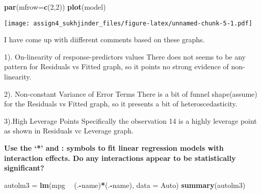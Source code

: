 \documentclass[]{article}
\newenvironment{Shaded}{\begin{snugshade}}{\end{snugshade}}
\newcommand{\KeywordTok}[1]{\textcolor[rgb]{0.13,0.29,0.53}{\textbf{#1}}}
\newcommand{\DataTypeTok}[1]{\textcolor[rgb]{0.13,0.29,0.53}{#1}}
\newcommand{\DecValTok}[1]{\textcolor[rgb]{0.00,0.00,0.81}{#1}}
\newcommand{\StringTok}[1]{\textcolor[rgb]{0.31,0.60,0.02}{#1}}
\newcommand{\OperatorTok}[1]{\textcolor[rgb]{0.81,0.36,0.00}{\textbf{#1}}}
\newcommand{\NormalTok}[1]{#1}
\begin{document}
\begin{Shaded}
\begin{Highlighting}[]
\KeywordTok{par}\NormalTok{(}\DataTypeTok{mfrow=}\KeywordTok{c}\NormalTok{(}\DecValTok{2}\NormalTok{,}\DecValTok{2}\NormalTok{))}
\KeywordTok{plot}\NormalTok{(model)}
\end{Highlighting}
\end{Shaded}

\texttt{[image: assign4\_sukhjinder\_files/figure-latex/unnamed-chunk-5-1.pdf]}

I have come up with diifferent comments based on these graphs.

1). On-linearity of response-predictors values There does not seems to
be any pattern for Residuals vs Fitted graph, so it points no strong
evidence of non-linearity.

2). Non-constant Variance of Error Terms There is a bit of funnel
shape(assume) for the Residuals vs Fitted graph, so it presents a bit of
heteroscedasticity.

3).High Leverage Points Specifically the observation 14 is a highly
leverage point as shown in Residuals vc Leverage graph.

\textbf{Use the `*' and : symbols to fit linear regression models with
interaction effects. Do any interactions appear to be statistically
significant?}

\begin{Shaded}
\begin{Highlighting}[]
\NormalTok{autolm3 =}\StringTok{ }\KeywordTok{lm}\NormalTok{(mpg }\OperatorTok{~}\StringTok{ }\NormalTok{(.}\OperatorTok{-}\NormalTok{name)}\OperatorTok{*}\NormalTok{(.}\OperatorTok{-}\NormalTok{name), }\DataTypeTok{data =}\NormalTok{ Auto)}
\KeywordTok{summary}\NormalTok{(autolm3)}
\end{Highlighting}
\end{Shaded}
\end{document}
